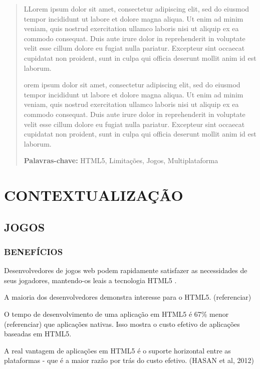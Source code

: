\documentclass[
12pt,
a4paper,
portuges,
draft
]{report}
\begin{document}
\renewcommand{\abstractname}{\Large\bfseries ABSTRACT}
\begin{abstract}
{ LLorem ipsum dolor sit amet, consectetur adipiscing elit, sed do eiusmod tempor incididunt ut labore et dolore magna aliqua. Ut enim ad minim veniam, quis nostrud exercitation ullamco laboris nisi ut aliquip ex ea commodo consequat. Duis aute irure dolor in reprehenderit in voluptate velit esse cillum dolore eu fugiat nulla pariatur. Excepteur sint occaecat cupidatat non proident, sunt in culpa qui officia deserunt mollit anim id est laborum.

orem ipsum dolor sit amet, consectetur adipiscing elit, sed do eiusmod tempor incididunt ut labore et dolore magna aliqua. Ut enim ad minim veniam, quis nostrud exercitation ullamco laboris nisi ut aliquip ex ea commodo consequat. Duis aute irure dolor in reprehenderit in voluptate velit esse cillum dolore eu fugiat nulla pariatur. Excepteur sint occaecat cupidatat non proident, sunt in culpa qui officia deserunt mollit anim id est laborum.
}

{\bfseries Palavras-chave:} HTML5, Limitações, Jogos,
Multiplataforma
\end{abstract}

{\listoffigures}
\clearpage
{\tableofcontents}
\chapter{CONTEXTUALIZAÇÃO}%

\section{JOGOS}

\subsection{BENEFÍCIOS}
Desenvolvedores de jogos web podem rapidamente satisfazer as
necessidades de seus jogadores, mantendo-os leais a tecnologia HTML5
\autocite{developingEffect}.

A maioria dos desenvolvedores demonstra interesse para o HTML5. (referenciar)

O tempo de desenvolvimento de uma aplicação em HTML5 é 67\% menor (referenciar)
que aplicações nativas. Isso mostra o custo efetivo de aplicações baseadas em HTML5. 

A real vantagem de aplicações em HTML5 é o suporte
horizontal entre as plataformas - que é a maior razão por trás do
custo efetivo. (HASAN et al, 2012)
\end{document}
